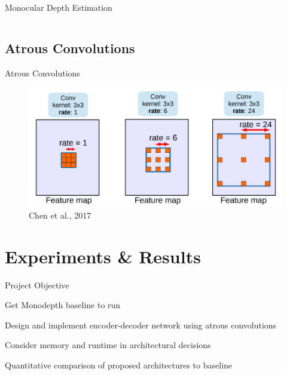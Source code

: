 \documentclass[11pt]{beamer}
\newenvironment{wideitemize}{\itemize\addtolength{\itemsep}{.75em}}{\enditemize}
\begin{document}
\begin{frame}[c]{Monocular Depth Estimation}
\begin{columns}
    \end{columns}

\end{frame}

\subsection{Atrous Convolutions}
\begin{frame}[c]{Atrous Convolutions}
\begin{figure}
    \centering
    \includegraphics[width=1.0\textwidth]{figures/atrous_conv.png}
    \caption{Chen et al., 2017}
\end{figure}

\end{frame}



\section{Experiments \& Results}

\begin{frame}[c]{Project Objective}
  \begin{wideitemize}
  \item Get Monodepth baseline to run
  \item Design and implement encoder-decoder network using atrous convolutions
  \item Consider memory and runtime in architectural decisions
  \item Quantitative comparison of proposed architectures to baseline
  \end{wideitemize}
\end{frame}
\end{document}
